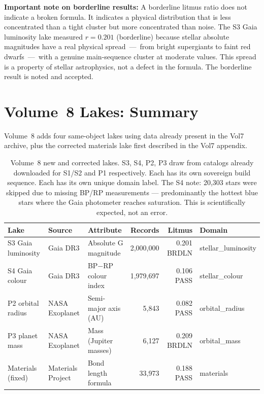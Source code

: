 \documentclass[11pt, letterpaper, openany]{book}
\begin{document}
\begin{warningbox}
\textbf{Important note on borderline results:} A borderline litmus ratio does not
indicate a broken formula. It indicates a physical distribution that is less
concentrated than a tight cluster but more concentrated than noise. The S3 Gaia
luminosity lake measured $r = 0.201$ (borderline) because stellar absolute
magnitudes have a real physical spread~---~from bright supergiants to faint red
dwarfs~---~with a genuine main-sequence cluster at moderate values. This spread
is a property of stellar astrophysics, not a defect in the formula. The borderline
result is noted and accepted.
\end{warningbox}

\section{Volume~8 Lakes: Summary}

Volume~8 adds four same-object lakes using data already present in the Vol7
archive, plus the corrected materials lake first described in the Vol7 appendix.

\begin{table}[H]
\centering
\renewcommand{\arraystretch}{1.4}
\small
\begin{tabular}{|l|l|l|r|r|l|}
\hline
\rowcolor{kishblue!10}
\textbf{Lake} & \textbf{Source} & \textbf{Attribute} & \textbf{Records} & \textbf{Litmus} & \textbf{Domain} \\
\hline\hline
S3 Gaia luminosity   & Gaia DR3          & Absolute G magnitude  & 2,000,000 & 0.201 BRDLN & stellar\_luminosity \\
S4 Gaia colour       & Gaia DR3          & BP$-$RP colour index  & 1,979,697 & 0.106 PASS  & stellar\_colour \\
P2 orbital radius    & NASA Exoplanet    & Semi-major axis (AU)  &     5,843 & 0.082 PASS  & orbital\_radius \\
P3 planet mass       & NASA Exoplanet    & Mass (Jupiter masses)  &     6,127 & 0.209 BRDLN & orbital\_mass \\
Materials (fixed)    & Materials Project & Bond length formula    &    33,973 & 0.188 PASS  & materials \\
\hline
\end{tabular}
\caption{Volume~8 new and corrected lakes. S3, S4, P2, P3 draw from catalogs
already downloaded for S1/S2 and P1 respectively. Each has its own sovereign
build sequence. Each has its own unique domain label. The S4 note: 20,303 stars
were skipped due to missing BP/RP measurements --- predominantly the hottest blue
stars where the Gaia photometer reaches saturation. This is scientifically
expected, not an error.}
\label{tab:v8_lakes}
\end{table}
\end{document}
